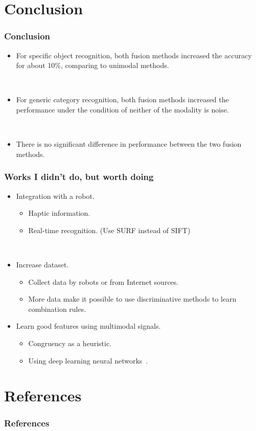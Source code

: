 \documentclass{beamer}
\begin{document}
  \section{Conclusion}
  \begin{frame}
    \frametitle{Conclusion}

    \begin{itemize}
      \item For specific object recognition, both fusion methods increased the accuracy for about 10\%, comparing to unimodal methods.

        ~
      \item For generic category recognition, both fusion methods increased the performance under the condition of neither of the modality is noise.

        ~
      \item There is no significant difference in performance between the two fusion methods.
    \end{itemize}
  \end{frame}

  \begin{frame}
    \frametitle{Works I didn't do, but worth doing}

    \begin{itemize}
      \item Integration with a robot.
        \begin{itemize}
          \item Haptic information.
          \item Real-time recognition. (Use SURF instead of SIFT)
        \end{itemize}

        ~
      \item Increase dataset.
        \begin{itemize}
          \item Collect data by robots or from Internet sources.
          \item More data make it possible to use discriminative methods to learn combination rules.
        \end{itemize}

      \item Learn good features using multimodal signals.
        \begin{itemize}
          \item Congruency as a heuristic.
          \item Using deep learning neural networks~\cite{ngiam_multimodal_2011}.
        \end{itemize}
    \end{itemize}
  \end{frame}


  \appendix
  \section*{References}
  \begin{frame}[allowframebreaks]
    \frametitle{References}
    {\scriptsize
      
        
    }
  \end{frame}

  
\end{document}

